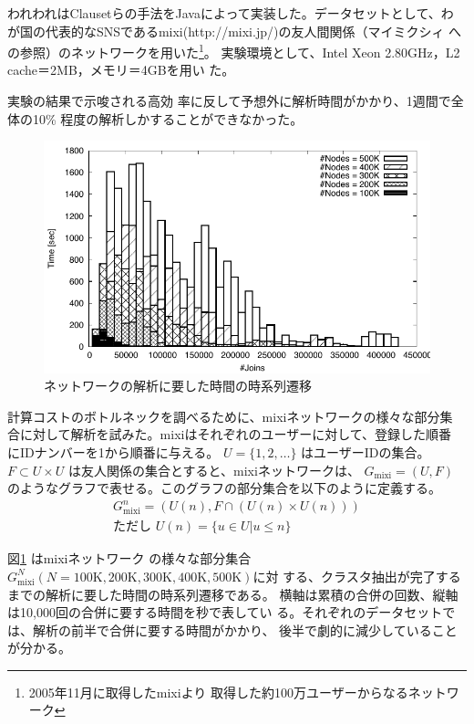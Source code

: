\documentclass [a4j,11pt] {jsarticle}
\begin{document}
われわれはClausetらの手法をJavaによって実装した。データセットとして、わ
が国の代表的なSNSであるmixi(http://mixi.jp/)の友人間関係（マイミクシィ
への参照）のネットワークを用いた\footnote {2005年11月に取得したmixiより
取得した約100万ユーザーからなるネットワーク}。
実験環境として、Intel Xeon 2.80GHz，L2 cache＝2MB，メモリ＝4GBを用い
た。

実験の結果\cite{Clauset04}で示唆される高効
率に反して予想外に解析時間がかかり、1週間で全体の10\%
程度の解析しかすることができなかった。

\begin {figure}[htbp]
  \centerline {\includegraphics [width=0.80\linewidth]{fig2-cnm-joins-time-series.pdf}}
  \caption {ネットワークの解析に要した時間の時系列遷移}
  \label {fig: newman time diff}
\end{figure}

計算コストのボトルネックを調べるために、mixiネットワークの様々な部分集
合に対して解析を試みた。mixiはそれぞれのユーザーに対して、登録した順番
にIDナンバーを1から順番に与える。
$U= \{1,2,\ldots\}$
はユーザーIDの集合。
$F \subset U\times U$
は友人関係の集合とすると、mixiネットワークは、
$G_{\text {mixi}} = (U, F)$
のようなグラフで表せる。このグラフの部分集合を以下のように定義する。
%
\begin {align*}
  G_{\text {mixi}}^n = (U(n), F \cap (U(n) \times U(n))) \\
  \text {ただし } U(n) = \{ u \in U | u \le n \}
\end {align*}

図\ref {fig: newman time diff} はmixiネットワーク
の様々な部分集合$G_{\text {mixi}}^N (N = \text {100K}, \text {200K},
\text {300K}, \text {400K}, \text {500K})$に対
する、クラスタ抽出が完了するまでの解析に要した時間の時系列遷移である。
横軸は累積の合併の回数、縦軸は10,000回の合併に要する時間を秒で表してい
る。それぞれのデータセットでは、解析の前半で合併に要する時間がかかり、
後半で劇的に減少していることが分かる。
\end{document}
